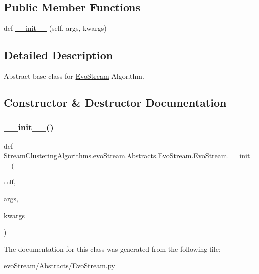 \subsection*{Public Member Functions}
\begin{DoxyCompactItemize}
\item 
def \hyperlink{classStreamClusteringAlgorithms_1_1evoStream_1_1Abstracts_1_1EvoStream_1_1EvoStream_a8cf745b0150af17c433357568e760d3e}{\+\_\+\+\_\+init\+\_\+\+\_\+} (self, args, kwargs)
\end{DoxyCompactItemize}


\subsection{Detailed Description}
Abstract base class for \hyperlink{classStreamClusteringAlgorithms_1_1evoStream_1_1Abstracts_1_1EvoStream_1_1EvoStream}{Evo\+Stream} Algorithm. 

\subsection{Constructor \& Destructor Documentation}
\mbox{\label{classStreamClusteringAlgorithms_1_1evoStream_1_1Abstracts_1_1EvoStream_1_1EvoStream_a8cf745b0150af17c433357568e760d3e}} 
\subsubsection{\texorpdfstring{\+\_\+\+\_\+init\+\_\+\+\_\+()}{\_\_init\_\_()}}
{\footnotesize\ttfamily def Stream\+Clustering\+Algorithms.\+evo\+Stream.\+Abstracts.\+Evo\+Stream.\+Evo\+Stream.\+\_\+\+\_\+init\+\_\+\+\_\+ (\begin{DoxyParamCaption}\item[{}]{self,  }\item[{}]{args,  }\item[{}]{kwargs }\end{DoxyParamCaption})}



The documentation for this class was generated from the following file\+:\begin{DoxyCompactItemize}
\item 
evo\+Stream/\+Abstracts/\hyperlink{EvoStream_8py}{Evo\+Stream.\+py}\end{DoxyCompactItemize}
